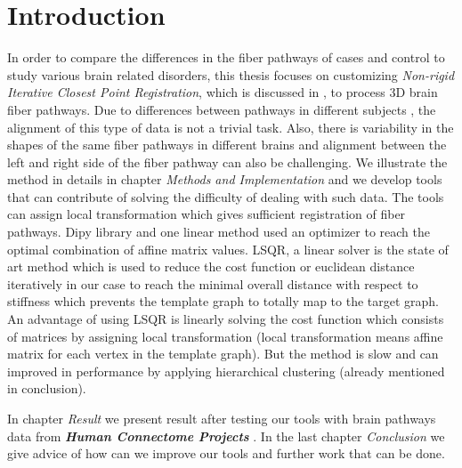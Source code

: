 \documentclass[../structure.tex]{subfiles}
\begin{document}
\chapter{Introduction}
In order to compare the differences in the fiber pathways of cases and control to study various brain related disorders, this thesis focuses on customizing \textit{Non-rigid Iterative Closest Point Registration}, which is discussed in \cite{Amberg2007}, to process 3D brain fiber pathways. Due to differences between pathways in different subjects , the alignment of this type of data is not a trivial task. Also, there is variability in the shapes of the same fiber pathways in different brains and alignment between the left and right side of the fiber pathway can also be challenging. We illustrate the method in details in chapter \textit{Methods and Implementation} and we develop tools that can contribute of solving the difficulty of dealing with such data. The tools can assign local transformation which gives sufficient registration of fiber pathways. Dipy library and one linear method used an optimizer to reach the optimal combination of affine matrix values.
LSQR, a linear solver is the state of art method which is used to reduce the cost function or euclidean distance iteratively in our case to reach the minimal overall distance with respect to stiffness which prevents the template graph to totally map to the target graph.
An advantage of using LSQR is linearly solving the cost function which consists of matrices by assigning local transformation (local transformation means affine matrix for each vertex in the template graph). But the method is slow and can improved in performance by applying hierarchical clustering (already mentioned in conclusion).

In chapter \textit{Result} we present result after testing our tools with 
brain pathways data from \textbf{\textit{Human Connectome Projects}} \cite{CCF}. In the last chapter \textit{Conclusion} we give advice of how can we improve our tools and further work that can be done.
\end{document}

